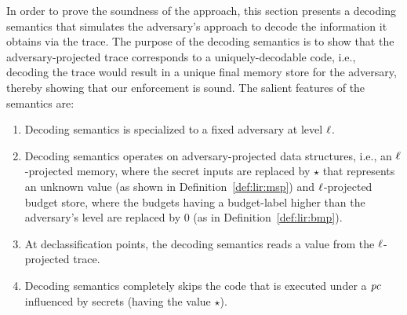 In order to prove the soundness of the approach, this section presents a  
decoding semantics that simulates the adversary's approach to decode the 
information it obtains via the trace. The purpose of the decoding 
semantics is to show that the adversary-projected trace 
corresponds to a uniquely-decodable code, i.e., decoding the trace would 
result in a unique final memory store for the adversary, thereby showing 
that our enforcement is sound. The salient features of the semantics are:
\begin{enumerate}
\item Decoding semantics is specialized to a fixed adversary at level
   $\ell$.
\item Decoding semantics operates on adversary-projected data structures,
  i.e., an $\ell$-projected memory, where the secret inputs are 
  replaced by $\star$ that represents an unknown 
  value (as shown in Definition~\ref{def:lir:msp}) and
  $\ell$-projected budget store, where the budgets having a 
  budget-label higher than the adversary's level  
  are replaced by $0$ (as in Definition~\ref{def:lir:bmp}). 
\item At declassification points, the decoding semantics
  reads a value from the $\ell$-projected trace. 
\item Decoding semantics completely skips the code that is executed 
  under a $\mathit{pc}$ influenced by secrets (having the value $\star$).
\end{enumerate}


